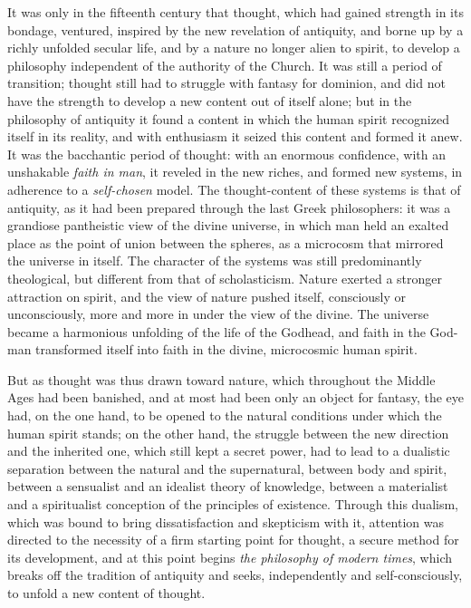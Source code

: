 \documentclass[12pt,a4paper,openany]{book}
\newcommand{\opage}[1]{\marginnote{\footnotesize\textit{[#1]}}}
\begin{document}
It was only in the fifteenth century that thought, which had gained
strength in its bondage, ventured, inspired by the new revelation of
antiquity, and borne up by a richly unfolded secular life, and by a
nature no longer alien to spirit, to develop a philosophy independent of
the authority of the Church. It was still a period of transition; thought
still had to struggle with fantasy for dominion, and did not have the
strength to develop a new content out of itself alone; but in the
philosophy of antiquity it found a content in which the human spirit
recognized itself in its reality, and with enthusiasm it seized this
content and formed it anew. It was the bacchantic period of thought:
with an enormous confidence, with an unshakable \emph{faith in man}, it
reveled in the new riches, and formed new systems, in adherence to a
\emph{self-chosen} model. The thought-content of these systems is that of
antiquity, as it had been
\opage{6}prepared through the last Greek philosophers: it was a grandiose
pantheistic view of the divine universe, in which man held an exalted
place as the point of union between the spheres, as a microcosm that
mirrored the universe in itself. The character of the systems was still
predominantly theological, but different from that of scholasticism.
Nature exerted a stronger attraction on spirit, and the view of nature
pushed itself, consciously or unconsciously, more and more in under the
view of the divine. The universe became a harmonious unfolding of the
life of the Godhead, and faith in the God-man transformed itself into
faith in the divine, microcosmic human spirit.

But as thought was thus drawn toward nature, which throughout the Middle
Ages had been banished, and at most had been only an object for
fantasy, the eye had, on the one hand, to be opened to the natural
conditions under which the human spirit stands; on the other hand, the
struggle between the new direction and the inherited one, which still
kept a secret power, had to lead to a dualistic separation between the
natural and the supernatural, between body and spirit, between a
sensualist and an idealist theory of knowledge, between a materialist
and a spiritualist conception of the principles of existence. Through
this dualism, which was bound to bring dissatisfaction and skepticism
with it, attention was directed to the necessity of a firm starting point
for thought, a secure method for its development, and at this point
begins \emph{the philosophy of modern times}, which breaks off the
tradition of antiquity and seeks, independently and self-consciously, to
unfold a new content of thought.
\end{document}
